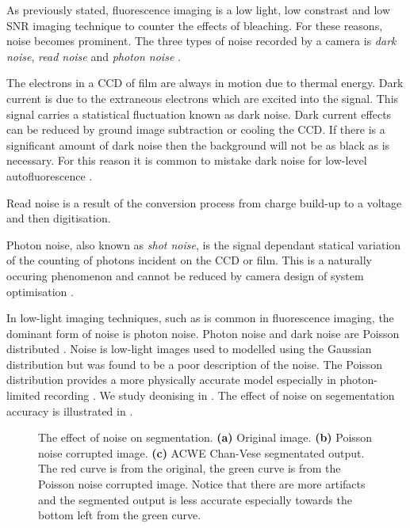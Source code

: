 \begin{definition}[Noise]
As previously stated, fluorescence imaging is a low light, low constrast and low SNR imaging technique to counter the effects of bleaching.
For these reasons, noise becomes prominent. The three types of noise recorded by a camera is \textit{dark noise}, \textit{read noise} and \textit{photon noise} \citep{Dobrucki2013,Danek2012,Matula2012,Hubeny2008}.

The electrons in a CCD of film are always in motion due to thermal energy.
Dark current is due to the extraneous electrons which are excited into the signal.
This signal carries a statistical fluctuation known as dark noise.
Dark current effects can be reduced by ground image subtraction or cooling the CCD.
If there is a significant amount of dark noise then the background will not be as black as is necessary.
For this reason it is common to mistake dark noise for low-level autofluorescence \citep{Ryan2016,Dobrucki2013}.

Read noise is a result of the conversion process from charge build-up to a voltage and then digitisation.

Photon noise, also known as \textit{shot noise}, is the signal dependant statical variation of the counting of photons incident on the CCD or film.
This is a naturally occuring phenomenon and cannot be reduced by camera design of system optimisation \cite{Ryan2016}.

In low-light imaging techniques, such as is common in fluorescence imaging, the dominant form of noise is photon noise.
Photon noise and dark noise are Poisson distributed \citep{Danek2012,Ryan2016,Kempen1999}.
Noise is low-light images used to modelled using the Gaussian distribution but was found to be a poor description of the noise.
The Poisson distribution provides a more physically accurate model especially in photon-limited recording \citep{Sarder2006}.
We study deonising in .
The effect of noise on segementation accuracy is illustrated in .

\begin{figure}[!t]
	\centering
	\caption{The effect of noise on segmentation. 
		\textbf{(a)} Original image. 
		\textbf{(b)} Poisson noise corrupted image.
		\textbf{(c)} ACWE Chan-Vese segmentated output. The red curve is from the original, the green curve is from the Poisson noise corrupted image. Notice that there are more artifacts and the segmented output is less accurate especially towards the bottom left from the green curve.}
	\label{fig:Noise}
\end{figure}
\end{definition}

